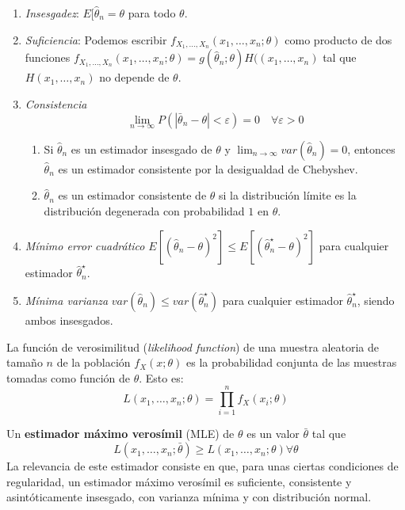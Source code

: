 	\begin{enumerate}
	\item \textit{Insesgadez}: 
			$E[\hat{\theta}_n = \theta$ para todo $\theta$.
	\item \textit{Suficiencia}: Podemos escribir
			$f_{X_1, \dots, X_n}(x_1, \dots, x_n; \theta)$ como producto de dos funciones $f_{X_1, \dots, X_n}(x_1, \dots, x_n; \theta) = g(\hat{\theta}_n; \theta) H((x_1, \dots, x_n)$ tal que $H(x_1, \dots, x_n)$ no depende de $\theta$.
	\item \textit{Consistencia}
		\[ \lim_{n \rightarrow \infty} P(|\bar{\theta}_n - \theta| < \varepsilon) = 0 \quad \forall \varepsilon > 0 \]
	\begin{enumerate}
		\item Si $\hat{\theta}_n$ es un estimador insesgado de $\theta$ y $\lim_{n \rightarrow \infty} var(\hat{\theta}_n) = 0$, entonces $\hat{\theta}_n$ es un estimador consistente por la desigualdad de Chebyshev.
		\item $\hat{\theta}_n$ es un estimador consistente de $\theta$ si la distribución límite es la distribución degenerada con probabilidad $1$ en $\theta$.
	\end{enumerate}
			
	\item \textit{Mínimo error cuadrático} 	$E[(\hat{\theta}_n - \theta)^2] \leq E[(\hat{\theta}_n^\star - \theta)^2]$ para cualquier estimador $\hat{\theta}_n^\star$.
	\item \textit{Mínima varianza} 	$var(\hat{\theta}_n) \leq var(\hat{\theta}^\star_n)$ para cualquier estimador $\hat{\theta}_n^\star$, siendo ambos insesgados.
	\end{enumerate}
	
\begin{definicion}
	La función de verosimilitud (\textit{likelihood function}) de una muestra aleatoria de tamaño $n$ de la población $f_X(x;\theta)$ es la probabilidad conjunta de las muestras tomadas como función de $\theta$. Esto es:
	\[ L(x_1, \dots, x_n; \theta) = 
		\prod\limits_{i=1}^n f_X(x_i;\theta)	\]
\end{definicion}

	Un \textbf{estimador máximo verosímil} (MLE) de $\theta$ es un valor $\bar{\theta}$ tal que 
	\[ L(x_1, \dots, x_n; \bar{\theta}) \geq 
			L(x_1, \dots, x_n; \theta) \forall \theta 	\]
	La relevancia de este estimador consiste en que, para unas ciertas condiciones de regularidad, un estimador máximo verosímil es suficiente, consistente y asintóticamente insesgado, con varianza mínima y con distribución normal.
	
